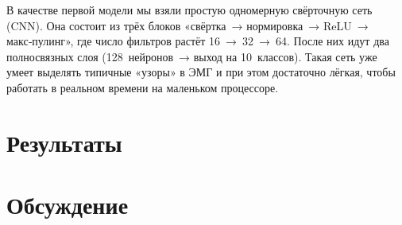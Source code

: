 \documentclass[a4paper,12pt]{article}
\begin{document}
В качестве первой модели мы взяли простую одномерную свёрточную сеть (CNN). Она состоит из трёх блоков «свёртка → нормировка → ReLU → макс‑пулинг», где число фильтров растёт 16 → 32 → 64. После них идут два полносвязных слоя (128 нейронов → выход на 10 классов). Такая сеть уже умеет выделять типичные «узоры» в ЭМГ и при этом достаточно лёгкая, чтобы работать в реальном времени на маленьком процессоре.

\section{Результаты}

\section{Обсуждение}
\end{document}
